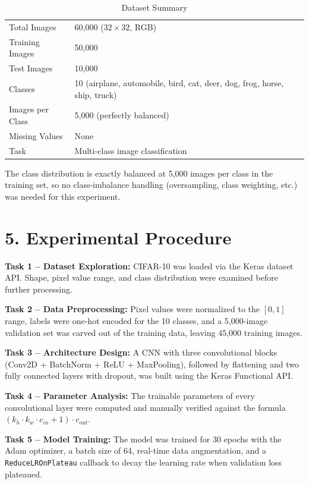 \documentclass[11pt]{article}
\begin{document}
\begin{table}[H]
\centering
\caption{Dataset Summary}
\begin{tabular}{ll}
\toprule
Total Images & 60,000 ($32\times32$, RGB) \\
Training Images & 50,000 \\
Test Images & 10,000 \\
Classes & 10 (airplane, automobile, bird, cat, deer, dog, frog, horse, ship, truck) \\
Images per Class & 5,000 (perfectly balanced) \\
Missing Values & None \\
Task & Multi-class image classification \\
\bottomrule
\end{tabular}
\end{table}

The class distribution is exactly balanced at 5,000 images per class in the training set, so no class-imbalance handling (oversampling, class weighting, etc.) was needed for this experiment.


\section*{5. Experimental Procedure}

\textbf{Task 1 -- Dataset Exploration:} CIFAR-10 was loaded via the Keras dataset API. Shape, pixel value range, and class distribution were examined before further processing.

\textbf{Task 2 -- Data Preprocessing:} Pixel values were normalized to the $[0,1]$ range, labels were one-hot encoded for the 10 classes, and a 5,000-image validation set was carved out of the training data, leaving 45,000 training images.

\textbf{Task 3 -- Architecture Design:} A CNN with three convolutional blocks (Conv2D + BatchNorm + ReLU + MaxPooling), followed by flattening and two fully connected layers with dropout, was built using the Keras Functional API.

\textbf{Task 4 -- Parameter Analysis:} The trainable parameters of every convolutional layer were computed and manually verified against the formula $(k_h \cdot k_w \cdot c_{in} + 1)\cdot c_{out}$.

\textbf{Task 5 -- Model Training:} The model was trained for 30 epochs with the Adam optimizer, a batch size of 64, real-time data augmentation, and a \texttt{ReduceLROnPlateau} callback to decay the learning rate when validation loss plateaued.
\end{document}
